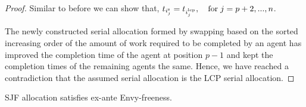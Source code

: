 \documentclass[letterpaper]{article} %
\theoremstyle{definition}
\newenvironment{customlemma}[1]
  {\renewcommand\theinnercustomlemma{#1}\innercustomlemma}
  {\endinnercustomlemma}
\begin{document}
\begin{proof}
\noindent Similar to before we can show that, $t_{i^{\textnormal{s}}_{j}} = t_{i^{\textnormal{lcp}}_{j}}, \quad \textnormal{for}\; j = p+2, ..., n$.

The newly constructed serial allocation formed by swapping based on the sorted increasing order of the amount of work required to be completed by an agent has improved the completion time of the agent at position $p-1$ and kept the completion times of the remaining agents the same. Hence, we have reached a contradiction that the assumed serial allocation is the LCP serial allocation.
\end{proof}

\begin{customlemma}{A.2} \label{sjf-ef}
SJF allocation satisfies ex-ante Envy-freeness.
\end{customlemma}
\end{document}
